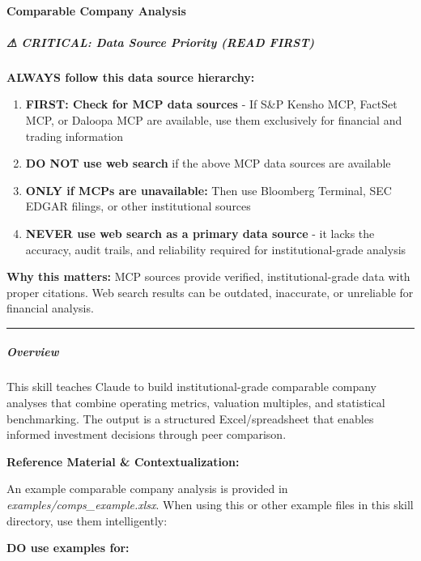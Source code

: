 \documentclass[11pt]{article}
\begin{document}
\paragraph{Comparable Company Analysis}\mbox{}\par

\subparagraph{⚠ CRITICAL: Data Source Priority (READ FIRST)}\mbox{}\par

\textbf{ALWAYS follow this data source hierarchy:}


\begin{enumerate}[leftmargin=*,itemsep=2pt,topsep=2pt]
\item {} \textbf{FIRST: Check for MCP data sources} - If S\&P Kensho MCP, FactSet MCP, or Daloopa MCP are available, use them exclusively for financial and trading information
\item {} \textbf{DO NOT use web search} if the above MCP data sources are available
\item {} \textbf{ONLY if MCPs are unavailable:} Then use Bloomberg Terminal, SEC EDGAR filings, or other institutional sources
\item {} \textbf{NEVER use web search as a primary data source} - it lacks the accuracy, audit trails, and reliability required for institutional-grade analysis
\end{enumerate}

\textbf{Why this matters:} MCP sources provide verified, institutional-grade data with proper citations. Web search results can be outdated, inaccurate, or unreliable for financial analysis.


\vspace{0.5em}\hrule\vspace{0.5em}

\subparagraph{Overview}\mbox{}\par
This skill teaches Claude to build institutional-grade comparable company analyses that combine operating metrics, valuation multiples, and statistical benchmarking. The output is a structured Excel/spreadsheet that enables informed investment decisions through peer comparison.


\textbf{Reference Material \& Contextualization:}


An example comparable company analysis is provided in \emph{examples/comps\_\allowbreak{}example.xlsx}. When using this or other example files in this skill directory, use them intelligently:


\textbf{DO use examples for:}
\end{document}
